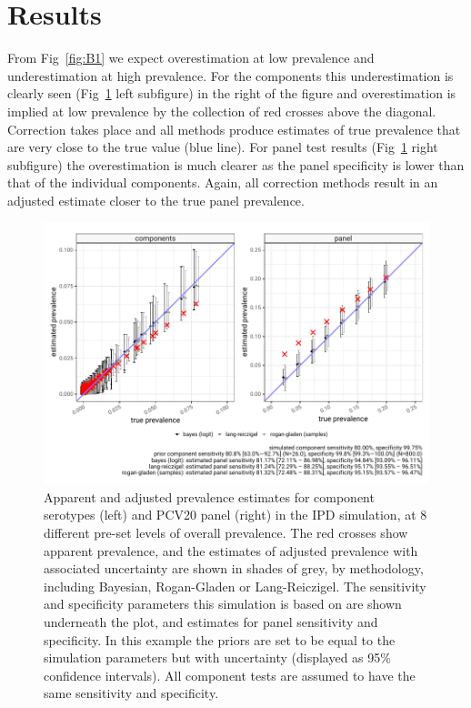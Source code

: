 \documentclass[a4paper, 12pt, twoside]{article}
\let\Oldsection\section
\renewcommand{\section}{\FloatBarrier\Oldsection}
\begin{document}
\section{Results}

From Fig~\ref{fig:B1} we expect overestimation at low prevalence and underestimation at high prevalence. For the components this underestimation is clearly seen (Fig~\ref{fig:B3} left subfigure) in the right of the figure and overestimation is implied at low prevalence by the collection of red crosses above the diagonal. Correction takes place and all methods produce estimates of true prevalence that are very close to the true value (blue line). For panel test results (Fig~\ref{fig:B3} right subfigure) the overestimation is much clearer as the panel specificity is lower than that of the individual components. Again, all correction methods result in an adjusted estimate closer to the true panel prevalence.

\begin{figure}[h!]
\centering
  \includegraphics{fig/simulation_result_sens_80_80_v2}
  \caption{Apparent and adjusted prevalence estimates for component serotypes (left) and PCV20 panel (right) in the IPD simulation, at 8 different pre-set levels of overall prevalence. The red crosses show apparent prevalence, and the estimates of adjusted prevalence with associated uncertainty are shown in shades of grey, by methodology, including Bayesian, Rogan-Gladen or Lang-Reiczigel. The sensitivity and specificity parameters this simulation is based on are shown underneath the plot, and estimates for panel sensitivity and specificity. In this example the priors are set to be equal to the simulation parameters but with uncertainty (displayed as 95\% confidence intervals). All component tests are assumed to have the same sensitivity and specificity.}
\label{fig:B3}
\end{figure}
\end{document}
